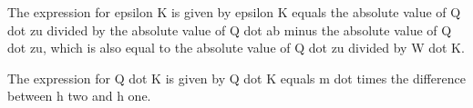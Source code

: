 The expression for epsilon K is given by epsilon K equals the absolute value of Q dot zu divided by the absolute value of Q dot ab minus the absolute value of Q dot zu, which is also equal to the absolute value of Q dot zu divided by W dot K.

The expression for Q dot K is given by Q dot K equals m dot times the difference between h two and h one.